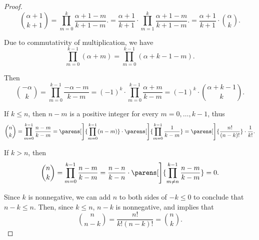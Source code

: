 \begin{proof}
  \begin{equation*}
    \binom {\alpha + 1} {k + 1}
    =
    \prod_{m=0}^k \frac {\alpha + 1 - m} {k + 1 - m}.
    =
    \frac {\alpha + 1} {k + 1} \cdot \prod_{m=1}^k \frac {\alpha + 1 - m} {k + 1 - m}.
    =
    \frac {\alpha + 1} {k + 1} \cdot \binom \alpha k.
  \end{equation*}

   Due to commutativity of multiplication, we have
  \begin{equation*}
    \prod_{m=0}^{k - 1} (\alpha + m)
    =
    \prod_{m=0}^{k - 1} (\alpha + k - 1 - m).
  \end{equation*}

  Then
  \begin{equation*}
    \binom {-\alpha} k
    =
    \prod_{m=0}^{k - 1} \frac {-\alpha - m} {k - m}
    =
    (-1)^k \cdot \prod_{m=0}^{k - 1} \frac {\alpha + m} {k - m}
    =
    (-1)^k \cdot \binom {\alpha + k - 1} k.
  \end{equation*}

   If \( k \leq n \), then \( n - m \) is a positive integer for every \( m = 0, \ldots, k - 1 \), thus
  \begin{equation*}
    \binom n k
    =
    \prod_{m=0}^{k - 1} \frac {n - m} {k - m}
    =
    \parens[\Bigg]{ \prod_{m=0}^{k - 1} (n - m) } \cdot \parens[\Bigg]{ \prod_{m=0}^{k - 1} \frac 1 {k - m} }
    =
    \parens[\Bigg]{ \frac {n!} {(n - k)!} } \cdot \frac 1 {k!}.
  \end{equation*}

  If \( k > n \), then
  \begin{equation*}
    \binom n k
    =
    \prod_{m=0}^{k - 1} \frac {n - m} {k - m}
    =
    \frac {n - n} {k - n} \cdot \parens[\Bigg]{ \prod_{m \neq n}^{k - 1} \frac {n - m} {k - m} }
    =
    0.
  \end{equation*}

   Since \( k \) is nonnegative, we can add \( n \) to both sides of \( -k \leq 0 \) to conclude that \( n - k \leq n \). Then, since \( k \leq n \), \( n - k \) is nonnegative, and  implies that
  \begin{equation*}
    \binom n {n - k} = \frac {n!} {k!(n - k)!} = \binom n k.
  \end{equation*}
\end{proof}

